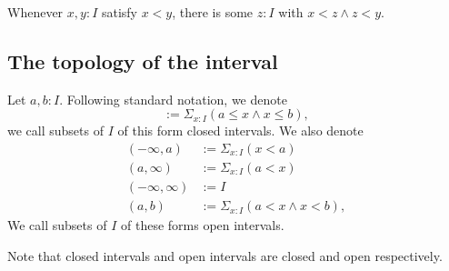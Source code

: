 
\begin{lemma}
  Whenever $x,y:I$ satisfy $x<y$, there is some $z:I$ with  $x<z \wedge z< y$. 
\end{lemma} 

%



\subsection{The topology of the interval}


\begin{definition}
  Let $a,b:I$. 
  Following standard notation, we denote
  \begin{equation}
    [a,b]:= \Sigma_{x:I} (a\leq x \wedge x \leq b),
  \end{equation}
  we call subsets of $I$ of this form closed intervals. 
%
  We also denote 
  \begin{align}
    (-\infty,a) &:= \Sigma_{x:I} (x < a)   \\
    (a,\infty) &:= \Sigma_{x:I} (a < x)  \\
    (-\infty,\infty) &:= I  \\
    (a,b) &:= \Sigma_{x:I} (a < x \wedge x < b),
  \end{align}
  We call subsets of $I$ of these forms open intervals. 
\end{definition}
\begin{remark}
  Note that closed intervals and open intervals are closed and open respectively. 
\end{remark}


